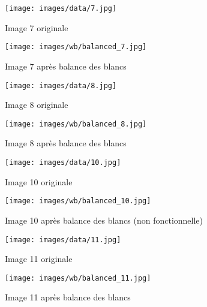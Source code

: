 \documentclass[12pt]{article}
\begin{document}
\begin{figure}[H]
    \centering
    \begin{minipage}{0.48\textwidth}
        \centering
        \texttt{[image: images/data/7.jpg]}
        \caption{Image 7 originale}
    \end{minipage}
    \hfill
    \begin{minipage}{0.48\textwidth}
        \centering
        \texttt{[image: images/wb/balanced\_7.jpg]}
        \caption{Image 7 après balance des blancs}
    \end{minipage}
\end{figure}

\begin{figure}[H]
    \centering
    \begin{minipage}{0.48\textwidth}
        \centering
        \texttt{[image: images/data/8.jpg]}
        \caption{Image 8 originale}
    \end{minipage}
    \hfill
    \begin{minipage}{0.48\textwidth}
        \centering
        \texttt{[image: images/wb/balanced\_8.jpg]}
        \caption{Image 8 après balance des blancs}
    \end{minipage}
\end{figure}

\begin{figure}[H]
    \centering
    \begin{minipage}{0.48\textwidth}
        \centering
        \texttt{[image: images/data/10.jpg]}
        \caption{Image 10 originale}
    \end{minipage}
    \hfill
    \begin{minipage}{0.48\textwidth}
        \centering
        \texttt{[image: images/wb/balanced\_10.jpg]}
        \caption{Image 10 après balance des blancs (non fonctionnelle)}
    \end{minipage}
\end{figure}

\begin{figure}[H]
    \centering
    \begin{minipage}{0.48\textwidth}
        \centering
        \texttt{[image: images/data/11.jpg]}
        \caption{Image 11 originale}
    \end{minipage}
    \hfill
    \begin{minipage}{0.48\textwidth}
        \centering
        \texttt{[image: images/wb/balanced\_11.jpg]}
        \caption{Image 11 après balance des blancs}
    \end{minipage}
\end{figure}
\end{document}
